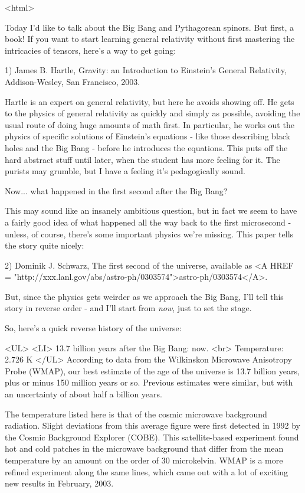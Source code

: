 <html>



Today I'd like to talk about the Big Bang and Pythagorean spinors.
But first, a book!  If you want to start learning general relativity
without first mastering the intricacies of tensors, here's a way to
get going:

1) James B. Hartle, Gravity: an Introduction to Einstein's General
Relativity, Addison-Wesley, San Francisco, 2003.

Hartle is an expert on general relativity, but here he avoids showing
off.  He gets to the physics of general relativity as quickly and
simply as possible, avoiding the usual route of doing huge amounts of
math first.  In particular, he works out the physics of specific
solutions of Einstein's equations - like those describing black holes
and the Big Bang - before he introduces the equations.  This puts off
the hard abstract stuff until later, when the student has more feeling
for it.  The purists may grumble, but I have a feeling it's pedagogically 
sound.

Now... what happened in the first second after the Big Bang?

This may sound like an insanely ambitious question, but in fact we
seem to have a fairly good idea of what happened all the way back to
the first microsecond - unless, of course, there's some important
physics we're missing.  This paper tells the story quite nicely:

2) Dominik J. Schwarz, The first second of the universe,
available as <A HREF = "http://xxx.lanl.gov/abs/astro-ph/0303574">astro-ph/0303574</A>.

But, since the physics gets weirder as we approach the Big Bang, 
I'll tell this story in reverse order - and I'll start from \emph{now},
just to set the stage.  

So, here's a quick reverse history of the universe:


<UL>
<LI>
13.7 billion years after the Big Bang: now.  <br>
Temperature: 2.726 K 
</UL>
According to data from the Wilkinskon Microwave Anisotropy Probe
(WMAP), our best estimate of the age of the universe is 13.7 billion
years, plus or minus 150 million years or so.  Previous estimates
were similar, but with an uncertainty of about half a billion years.

The temperature listed here is that of the cosmic microwave background
radiation.  Slight deviations from this average figure were first
detected in 1992 by the Cosmic Background Explorer (COBE).  This
satellite-based experiment found hot and cold patches in the microwave
background that differ from the mean temperature by an amount on the
order of 30 microkelvin.  WMAP is a more refined experiment along the
same lines, which came out with a lot of exciting new results in
February, 2003.


